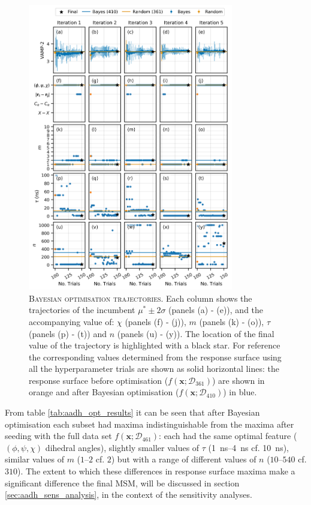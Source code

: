 \begin{figure}[p]
    \centering
    \includegraphics[width=0.8\textwidth]{chapters/msm_optimization/figures/aadh_opt_traj_act_s_d.png}
    \caption[Bayesian optimisation trajectories]{\textsc{Bayesian optimisation trajectories}. Each column shows the trajectories of the incumbent $\mu^{*} \pm  2\sigma$ (panels (a) - (e)), and the accompanying value of: $\chi$ (panels (f) - (j)), $m$ (panels (k) - (o)), $\tau$ (panels (p) - (t)) and $n$ (panels (u) - (y)). The location of the final value of the trajectory is highlighted with a black star. For reference the corresponding values determined from the response surface using all the hyperparameter trials are shown as solid horizontal lines: the response surface before optimisation ($f\left(\mathbf{x}; \mathcal{D}_{361}\right)$) are shown in orange and after Bayesian optimisation ($f\left(\mathbf{x}; \mathcal{D}_{410}\right)$) in blue.}
    \label{fig:aadh_opt_traj_d}
\end{figure}

From  table \ref{tab:aadh_opt_results} it can be seen that after Bayesian optimisation each subset had maxima indistinguishable from the maxima after seeding with the full data set $f\left(\mathbf{x};\mathcal{D}_{461}\right)$: each had the same optimal feature ($(\phi, \psi, \chi)$ dihedral angles), slightly smaller values of $\tau$ (\SIrange{1}{4}{\nano\second} cf. \SI{10}{\nano\second}), similar values of $m$ ($\numrange[range-phrase=\text{--}]{1}{2}$ cf. $2$) but with a range of different values of $n$ ($\numrange[range-phrase=\text{--}]{10}{540}$ cf. $310$). The extent to which these differences in response surface maxima make a significant difference the final MSM, will be discussed in section \ref{sec:aadh_sens_analysis}, in the context of the sensitivity analyses.

